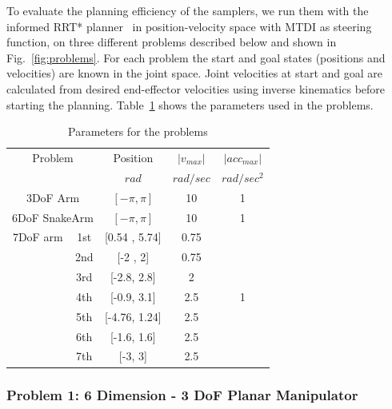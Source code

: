 \documentclass[letterpaper, 10 pt, conference]{ieeeconf}  %
\begin{document}
To evaluate the planning efficiency of the samplers, we run them with the informed RRT* planner~\cite{GSB14} in position-velocity space with MTDI as steering function, on three different problems described below and shown in Fig.~\ref{fig:problems}. 
For each problem the start and goal states (positions and velocities) are known in the joint space. 
Joint velocities at start and goal are calculated from desired end-effector velocities using inverse kinematics before starting the planning. Table~\ref{tab:params} shows the parameters used in the problems.


\begin {table}[H]
\caption {\captionstyle Parameters for the problems} \label{tab:params} 
\begin{center}
	\begin{tabular}{c c c c c} 
\toprule
\multicolumn{2}{c}{Problem} & Position  & $ | v_{max} |  $ & $|acc_{max}|$ \\ [0.5ex] 
    &    &    $rad$       &  $rad/sec$    &  $rad/sec^2$ \\
\midrule
\multicolumn{2}{c}{3DoF Arm} & $[-\pi, \pi]$ & 10 & 1 \\ 
\midrule
\multicolumn{2}{c}{6DoF SnakeArm} & $[-\pi, \pi]$ & 10 & 1 \\
\midrule
7DoF arm                  & 1st & [0.54 , 5.74] & 0.75 & \multirow{7}{*}{1} \\
\rule{0pt}{3ex}           & 2nd & [-2 , 2]             & 0.75 &  \\
\rule{0pt}{3ex}           & 3rd & [-2.8, 2.8]          &  2   &  \\
\rule{0pt}{3ex}           & 4th & [-0.9, 3.1]          & 2.5  &  \\
\rule{0pt}{3ex}           & 5th & [-4.76, 1.24]        & 2.5  &  \\
\rule{0pt}{3ex}           & 6th & [-1.6, 1.6]          & 2.5  &  \\
\rule{0pt}{3ex}          & 7th & [-3, 3]              & 2.5  &  \\
\bottomrule
\end{tabular}
\end{center}
\end{table}
\vspace{-2pt}

\subsubsection{Problem 1: 6 Dimension - 3 DoF Planar Manipulator}
\end{document}
